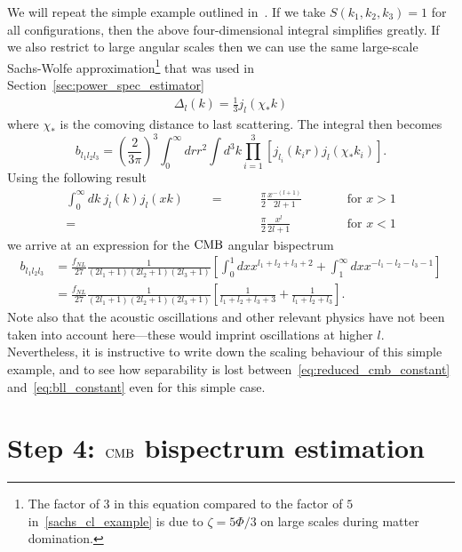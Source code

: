     We will repeat the simple example outlined in~\cite{FergShell_2}. If we
    take ${S(k_1,k_2,k_3)=1}$ for all configurations, then the above four-dimensional integral
    simplifies greatly. If we also restrict to large angular scales
    then we can use the same large-scale Sachs-Wolfe approximation\footnote{
    The factor of $3$ in this equation compared to the factor of $5$
    in~\eqref{sachs_cl_example} is due to $\zeta=5\Phi/3$
    on large scales during matter domination.
}
    that was used in Section~\ref{sec:power_spec_estimator}
    \begin{align}
        \Delta_l(k) = \frac{1}{3}j_l(\chi_*k)
    \end{align}
    where $\chi_*$ is the comoving distance to last scattering.
    The integral then becomes
    \begin{equation}
    \label{eq:reduced_cmb_constant}
    b_{l_1l_2l_3} = \left(\frac{2}{3\pi}\right)^3\int_{0}^{\infty}drr^2
        \int d^3k \prod_{i=1}^{3}\left[j_{l_i}(k_ir)j_l(\chi_*k_i)\right].
    \end{equation}
    Using the following result
    \begin{align}
        \int_0^\infty dk~j_l(k)j_l(xk)\qquad=\qquad&\frac{\pi}{2}\frac{x^{-(l+1)}}{2l+1}\qquad&&\text{for $x>1$}\\
                            =\qquad&\frac{\pi}{2}\frac{x^{l}}{2l+1}\qquad&&\text{for $x<1$}
    \end{align}
    we arrive at an expression for the $\text{CMB}$ angular bispectrum
    \begin{align} 
        b_{l_1l_2l_3} &= \frac{f_{NL}}{27}\frac{1}{(2l_1+1)(2l_2+1)(2l_3+1)}
        \left[\int^1_0dx x^{l_1+l_2+l_3+2}+\int^\infty_1dx x^{-l_1-l_2-l_3-1}\right]\label{eq:bll_constant_integral}\\
                &= \frac{f_{NL}}{27}\frac{1}{(2l_1+1)(2l_2+1)(2l_3+1)}
        \left[\frac{1}{l_1+l_2+l_3+3}+\frac{1}{l_1+l_2+l_3}\right]\label{eq:bll_constant}.
    \end{align}
    Note also that the acoustic oscillations and
    other relevant physics have not been taken
    into account here---these would imprint oscillations at higher $l$.
    Nevertheless, it is instructive to write down the scaling behaviour of this
    simple example, and to see how separability is lost between~\eqref{eq:reduced_cmb_constant}
    and~\eqref{eq:bll_constant} even for this simple case.


    \section{Step 4: $\text{CMB}$ bispectrum estimation}\label{sec:cmb_bis_est}
